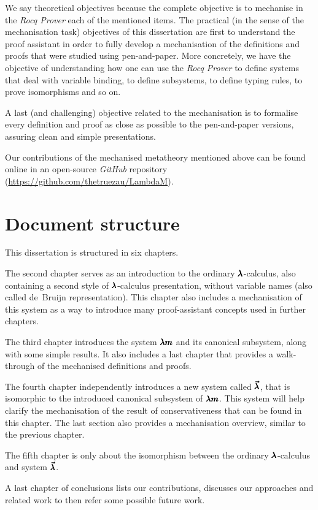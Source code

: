 We say theoretical objectives because the complete objective is to mechanise in the \textit{Rocq Prover} each of the mentioned items.
The practical (in the sense of the mechanisation task) objectives of this dissertation are first to understand the proof assistant in order to fully develop a mechanisation of the definitions and proofs that were studied using pen-and-paper.
More concretely, we have the objective of understanding how one can use the \textit{Rocq Prover} to define systems that deal with variable binding, to define subsystems, to define typing rules, to prove isomorphisms and so on.

A last (and challenging) objective related to the mechanisation is to formalise every definition and proof as close as possible to the pen-and-paper versions, assuring clean and simple presentations.

Our contributions of the mechanised metatheory mentioned above can be found online in an open-source \textit{GitHub} repository (\href{https://github.com/thetruezau/LambdaM}{https://github.com/thetruezau/LambdaM}).

\section{Document structure}

This dissertation is structured in six chapters.


The second chapter serves as an introduction to the ordinary $\pmb{\lambda}$-calculus, also containing a second style of $\pmb{\lambda}$-calculus presentation, without variable names (also called de~Bruijn representation).
This chapter also includes a mechanisation of this system as a way to introduce many proof-assistant concepts used in further chapters.

The third chapter introduces the system $\pmb{\lambda m}$ and its canonical subsystem, along with some simple results.
It also includes a last chapter that provides a walk-through of the mechanised definitions and proofs.

The fourth chapter independently introduces a new system called $\pmb{\vec \lambda}$, that is isomorphic to the introduced canonical subsystem of $\pmb{\lambda m}$.
This system will help clarify the mechanisation of the result of conservativeness that can be found in this chapter.
The last section also provides a mechanisation overview, similar to the previous chapter.

The fifth chapter is only about the isomorphism between the ordinary $\pmb{\lambda}$-calculus and system $\pmb{\vec \lambda}$.

A last chapter of conclusions lists our contributions, discusses our approaches and related work to then refer some possible future work.


